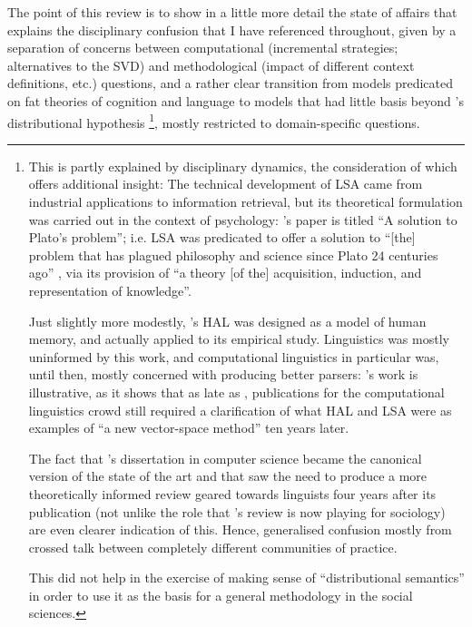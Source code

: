 The point of this review is to show in a little more detail the state of affairs that explains the disciplinary confusion that I have referenced throughout, given by a separation of concerns between computational (incremental strategies; alternatives to the SVD) and methodological (impact of different context definitions, etc.) questions, and a rather clear transition from models predicated on fat theories of cognition and language to models that had little basis beyond \citeauthor{firth1957}'s distributional hypothesis \citep{harris1988,harris1991}\footnote{
    \label{foot:lingua_warz}
    This is partly explained by disciplinary dynamics, the consideration of which offers additional insight:
    The technical development of LSA came from industrial applications to information retrieval, but its theoretical formulation was carried out in the context of psychology: \citeauthor{landauer1997}'s paper is titled ``A solution to Plato's problem''; i.e. LSA was predicated to offer a solution to ``[the] problem that has plagued philosophy and science since Plato 24 centuries ago''
    , via its provision of
    ``a theory [of the] acquisition, induction, and representation of knowledge''.

    Just slightly more modestly, \citeauthor{lund1995}'s HAL was designed as a model of human memory, and actually applied to its empirical study.
    Linguistics was mostly uninformed by this work, and computational linguistics in particular was, until then, mostly concerned with producing better parsers: \citeauthor{rohde2006}'s work is illustrative, as it shows that as late as \citeyear{rohde2006}, publications for the computational linguistics crowd still required a clarification of what HAL and LSA were as examples of ``a new vector-space method'' ten years later.

    The fact that \citeauthor{sahlgren2006}'s \citeyear{sahlgren2006} dissertation in computer science became the canonical version of the state of the art and that \citeauthor{turney2010} saw the need to produce a more theoretically informed review geared towards linguists four years after its publication (not unlike the role that \citeauthor{evans2016}'s \citeyear{evans2016} review is now playing for sociology) are even clearer indication of this.
    Hence, generalised confusion mostly from crossed talk between completely different communities of practice.

    This did not help in the exercise of making sense of ``distributional semantics'' in order to use it as the basis for a general methodology in the social sciences.
},  mostly restricted to domain-specific questions.

